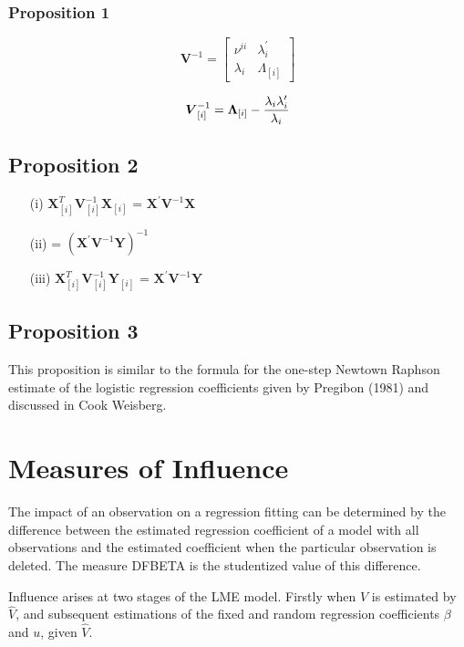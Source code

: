 \documentclass[12pt, a4paper]{article}
\theoremstyle{plain}
\theoremstyle{definition}
\theoremstyle{remark}
\begin{document}
\subsubsection{Proposition 1}

\[
\boldsymbol{V}^{-1} =
\left[ \begin{array}{cc}
\nu^{ii} & \lambda_{i}^{\prime}  \\
\lambda_{i} & \Lambda_{[i]}
\end{array}\right] \]


\[\boldsymbol{V}_{[i]}^{-1} = \boldsymbol{\Lambda}_{[i]} - { \lambda_{i} \lambda_{i} ^{\prime} \over \lambda_{i} } \]

\subsection{Proposition 2}

\begin{itemize}
\item[(i)] $ \boldsymbol{X}_{[i]}^{T}\boldsymbol{V}^{-1}_{[i]}\boldsymbol{X}_{[i]}$ = $\boldsymbol{X}^{\prime}\boldsymbol{V}^{-1}\boldsymbol{X}$
\item[(ii)] = $(\boldsymbol{X}^{\prime}\boldsymbol{V}^{-1}\boldsymbol{Y})^{-1}$
\item[(iii)] $ \boldsymbol{X}_{[i]}^{T}\boldsymbol{V}^{-1}_{[i]}\boldsymbol{Y}_{[i]}$ = $\boldsymbol{X}^{\prime}\boldsymbol{V}^{-1}\boldsymbol{Y}$
\end{itemize}
\subsection{Proposition 3}
This proposition is similar to the formula for the one-step Newtown Raphson estimate of the logistic regression coefficients given by Pregibon (1981) and discussed in Cook Weisberg.
\newpage
\section{Measures of Influence}
The impact of an observation on a regression fitting can be determined by the difference between the estimated regression coefficient of a model with all observations and the estimated coefficient when the particular observation is deleted. The measure DFBETA is the studentized value of this difference.

Influence arises at two stages of the LME model. Firstly when $V$ is estimated by $\hat{V}$, and subsequent
estimations of the fixed and random regression coefficients $\beta$ and $u$, given $\hat{V}$.
\end{document}
